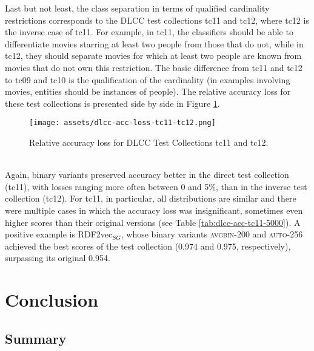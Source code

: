 \documentclass[11pt,titlepage,oneside,openany]{book}
\begin{document}
Last but not least, the class separation in terms of qualified cardinality restrictions corresponds to the DLCC test collections tc11 and tc12, where tc12 is the inverse case of tc11. For example, in tc11, the classifiers should be able to differentiate movies starring at least two people from those that do not, while in tc12, they should separate movies for which at least two people are known from movies that do not own this restriction. The basic difference from tc11 and tc12 to tc09 and tc10 is the qualification of the cardinality (in examples involving movies, entities should be instances of people). The relative accuracy loss for these test collections is presented side by side in Figure \ref{fig:dlcc-acc-loss-tc11-tc12}.\\
\begin{figure}[h!]
    \centering
    \centerline{\texttt{[image: assets/dlcc-acc-loss-tc11-tc12.png]}}
    \vspace*{-3mm}
    \caption{Relative accuracy loss for DLCC Test Collections tc11 and tc12.}
    \label{fig:dlcc-acc-loss-tc11-tc12}
\end{figure}
\\
Again, binary variants preserved accuracy better in the direct test collection (tc11), with losses ranging more often between 0 and 5\%, than in the inverse test collection (tc12). For tc11, in particular, all distributions are similar and there were multiple cases in which the accuracy loss was insignificant, sometimes even higher scores than their original versions (see Table \ref{tab:dlcc-acc-tc11-5000}). A positive example is RDF2vec$_{SG}$, whose binary variants \textsc{avgbin-200} and \textsc{auto-256} achieved the best scores of the test collection (0.974 and 0.975, respectively), surpassing its original 0.954.


\chapter{Conclusion}
\label{cha:conclusion}


\section{Summary}
\label{sec:summary}
\end{document}
